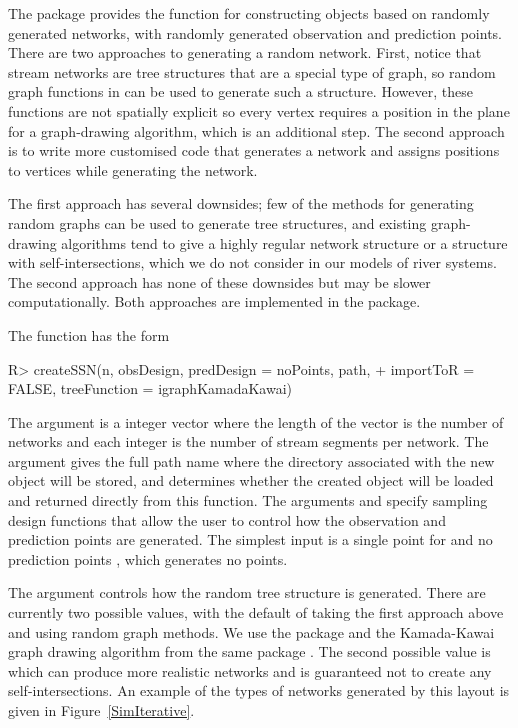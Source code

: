 \documentclass[nojss]{jss}
\renewenvironment{Schunk}{\vspace{\topsep}}{\vspace{\topsep}}
\begin{document}
The  package provides the function  for
constructing  objects based on randomly
generated networks, with randomly generated observation and prediction
points. There are two approaches to generating a random
network. First, notice that stream networks are tree structures that
are a special type of graph, so random graph functions in 
can be used to generate such a structure. However, these functions are
not spatially explicit so every vertex requires a position in the
plane for a graph-drawing algorithm, which is an additional step. The
second approach is to write more customised code that generates a
network and assigns positions to vertices while generating the
network.

The first approach has several downsides; few of the methods for
generating random graphs can be used to generate tree structures, and
existing graph-drawing algorithms tend to give a highly regular
network structure or a structure with self-intersections, which we do not consider in our models of river systems. The second approach has none of these
downsides but may be slower computationally. Both approaches are
implemented in the  package.

The  function has the form
\begin{Schunk}
\begin{Sinput}
R> createSSN(n, obsDesign, predDesign = noPoints, path,
+     importToR = FALSE, treeFunction = igraphKamadaKawai)
\end{Sinput}
\end{Schunk}

The argument  is a integer vector where the length of the
vector is the number of networks and each integer is the number of
stream segments per network. The  argument gives the full
path name where the  directory associated with the new
 object will be stored, and
 determines whether the created object will be loaded
and returned directly from this function. The arguments
 and  specify sampling design
functions that allow the user to control how the observation and
prediction points are generated. The simplest input is a single point
for  and no prediction points , which generates no points.

The argument  controls how the random tree
structure is generated. There are currently two possible values, with
the default of  taking the first approach
above and using random graph methods. We use the  package
and the Kamada-Kawai graph drawing algorithm from the same package
\citep{Csar:Nepu:2006}. The second possible value is
 which can produce more realistic networks
and is guaranteed not to create any self-intersections.  An example of
the types of networks generated by this layout is given in
Figure~\ref{SimIterative}.
\end{document}
